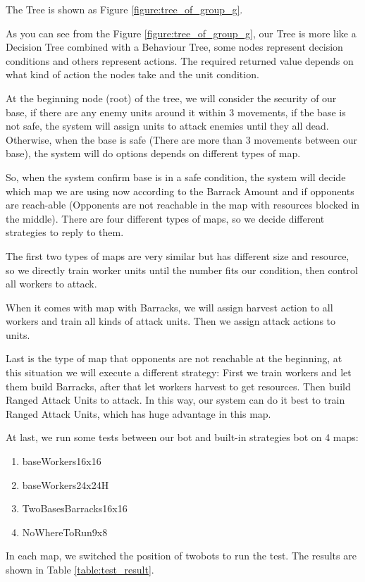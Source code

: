 The Tree is shown as Figure \ref{figure:tree_of_group_g}.



As you can see from the Figure \ref{figure:tree_of_group_g}, our Tree is more like a Decision Tree combined with
a Behaviour Tree, some nodes represent decision conditions and others represent actions. The required
returned value depends on what kind of action the nodes take and the unit condition. 

At the beginning node (root) of the tree, we will consider the security of our base, if there are any enemy
units around it within 3 movements, if the base is not safe, the system will assign units to attack enemies
until they all dead. Otherwise, when the base is safe (There are more than 3 movements between our base),
the system will do options depends on different types of map. 

So, when the system confirm base is in a safe condition, the system will decide which map we are using now
according to the Barrack Amount and if opponents are reach-able (Opponents are not reachable in the map with
resources blocked in the middle). There are four different types of maps, so we decide different strategies
to reply to them. 

The first two types of maps are very similar but has different size and resource, so we directly train worker
units until the number fits our condition, then control all workers to attack.



When it comes with map with Barracks, we will assign harvest action to all workers and train all kinds of
attack units. Then we assign attack actions to units.



Last is the type of map that opponents are not reachable at the beginning, at this situation we will execute
a different strategy: First we train workers and let them build Barracks, after that let workers harvest to get
resources. Then build Ranged Attack Units to attack. In this way, our system can do it best to train Ranged Attack
Units, which has huge advantage in this map.

At last, we run some tests between our bot and built-in strategies bot on 4 maps:
\begin{enumerate}
    \item baseWorkers16x16
    \item baseWorkers24x24H
    \item TwoBasesBarracks16x16
    \item NoWhereToRun9x8
\end{enumerate}
In each map, we switched the position of twobots to run the test. The results are shown in Table \ref{table:test_result}.

